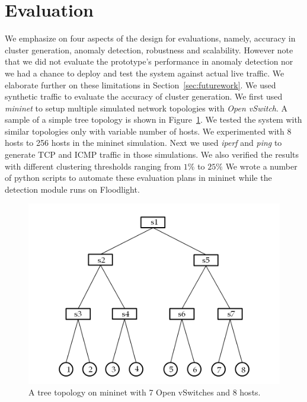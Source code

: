 \documentclass[twocolumn]{article}
\begin{document}
\section{Evaluation}
\label{sec:evaluation}
We emphasize on four aspects of the design for evaluations, namely, accuracy in cluster generation, anomaly detection, robustness and scalability.  However note that we did not evaluate the prototype's performance in anomaly detection nor we had a chance to deploy and test the system against actual live traffic. We elaborate further on these limitations in Section~\ref{sec:futurework}.  We used synthetic traffic to evaluate the accuracy of cluster generation. We first used \emph{mininet} to setup multiple simulated network topologies with \emph{Open vSwitch}. A sample of a simple tree topology is shown in Figure~\ref{fig:simpletopology}. We tested the system with similar topologies only with variable number of hosts. We experimented with 8 hosts to 256 hosts in the mininet simulation. Next we used \emph{iperf} and \emph{ping} to generate TCP and ICMP traffic in those simulations. We also verified the results with different clustering thresholds ranging from $1\%$ to $25\%$ We wrote a number of python scripts to automate these evaluation plans in mininet while the detection module runs on Floodlight. 
\begin{figure}[!ht]
\centering
	\includegraphics[scale=0.3]{images/simpleevaluationplan.png}
\caption{A tree topology on mininet with 7 Open vSwitches and 8 hosts.}
\label{fig:simpletopology}
\end{figure}
\end{document}
